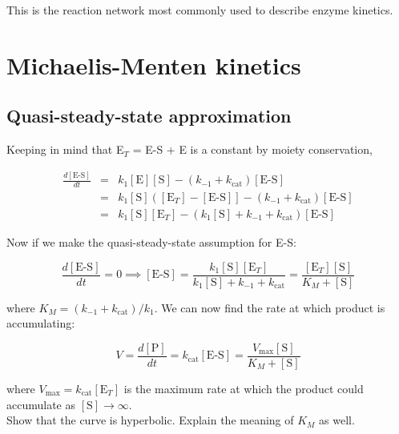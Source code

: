 \documentclass{article}
\begin{document}
This is the reaction network most commonly used to describe enzyme kinetics.

\section*{Michaelis-Menten kinetics}

\subsection*{Quasi-steady-state approximation}

Keeping in mind that E$_T$ = E-S + E is a constant by moiety conservation,

\begin{eqnarray*}
\frac{d\left[ \textrm{E-S}\right]}{dt} & = & k_1 \left[ \textrm{E} \right]\left[ \textrm{S} \right] - \left( k_{-1} + k_{\textrm{cat}} \right) \left[ \textrm{E-S} \right]\\
& = & k_1 \left[ \textrm{S} \right] \left( \left[ \textrm{E}_T \right] - \left[ \textrm{E-S} \right] \right] - \left( k_{-1} + k_{\textrm{cat}} \right) \left[ \textrm{E-S} \right] \\
& = &  k_1 \left[ \textrm{S} \right]  \left[ \textrm{E}_T \right] - \left(k_1 \left[ \textrm{S} \right] + k_{-1} + k_{\textrm{cat}} \right) \left[ \textrm{E-S} \right] 
\end{eqnarray*}

Now if we make the quasi-steady-state assumption for E-S:

\[ \frac{d\left[ \textrm{E-S}\right]}{dt}= 0 \implies \left[ \textrm{E-S} \right] =  \frac{k_1 \left[ \textrm{S} \right]  \left[ \textrm{E}_T \right]}{k_1 \left[ \textrm{S} \right] + k_{-1} + k_{\textrm{cat}} } = \frac{ \left[ \textrm{E}_T \right] \left[ \textrm{S} \right]}{K_M + \left[ \textrm{S} \right] } \]

where $K_M = (k_{-1} + k_{\textrm{cat}})/k_1$. We can now find the rate at which product is accumulating:

\[ V = \frac{d\left[ \textrm{P}\right]}{dt} = k_{\textrm{cat}} \left[ \textrm{E-S} \right] = \frac{V_{\textrm{max}} \left[ \textrm{S} \right]}{K_M + \left[ \textrm{S} \right] }\]

where $V_{\textrm{max}} = k_{\textrm{cat}}\left[ \textrm{E}_T \right]$ is the maximum rate at which the product could accumulate as $\left[ \textrm{S} \right]  \to \infty$.\\

Show that the curve is hyperbolic. Explain the meaning of $K_M$ as well.
\end{document}
